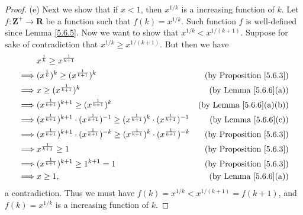 \begin{proof}{(e)}
    Next we show that if \(x < 1\), then \(x^{1 / k}\) is a increasing function of \(k\).
    Let \(f : \mathbf{Z}^+ \to \mathbf{R}\) be a function such that \(f(k) = x^{1 / k}\).
    Such function \(f\) is well-defined since Lemma \ref{5.6.5}.
    Now we want to show that \(x^{1 / k} < x^{1 / (k + 1)}\).
    Suppose for sake of contradiction that \(x^{1 / k} \geq x^{1 / (k + 1)}\).
    But then we have
    \begin{align*}
                 & x^{\frac{1}{k}} \geq x^{\frac{1}{k + 1}}                                                                                                                           \\
        \implies & (x^{\frac{1}{k}})^k \geq (x^{\frac{1}{k + 1}})^k                                                                             & \text{(by Proposition \ref{5.6.3})} \\
        \implies & x \geq (x^{\frac{1}{k + 1}})^k                                                                                               & \text{(by Lemma \ref{5.6.6}(a))}    \\
        \implies & (x^{\frac{1}{k + 1}})^{k + 1} \geq (x^{\frac{1}{k + 1}})^k                                                                   & \text{(by Lemma \ref{5.6.6}(a)(b))} \\
        \implies & (x^{\frac{1}{k + 1}})^{k + 1} \cdot (x^{\frac{1}{k + 1}})^{-1} \geq (x^{\frac{1}{k + 1}})^k \cdot (x^{\frac{1}{k + 1}})^{-1} & \text{(by Lemma \ref{5.6.6}(c))}    \\
        \implies & (x^{\frac{1}{k + 1}})^{k + 1} \cdot (x^{\frac{1}{k + 1}})^{-k} \geq (x^{\frac{1}{k + 1}})^k \cdot (x^{\frac{1}{k + 1}})^{-k} & \text{(by Proposition \ref{5.6.3})} \\
        \implies & x^{\frac{1}{k + 1}} \geq 1                                                                                                   & \text{(by Proposition \ref{5.6.3})} \\
        \implies & (x^{\frac{1}{k + 1}})^{k + 1} \geq 1^{k + 1} = 1                                                                             & \text{(by Proposition \ref{5.6.3})} \\
        \implies & x \geq 1,                                                                                                                    & \text{(by Lemma \ref{5.6.6}(a))}
    \end{align*}
    a contradiction.
    Thus we must have \(f(k) = x^{1 / k} < x^{1 / (k + 1)} = f(k + 1)\), and \(f(k) = x^{1 / k}\) is a increasing function of \(k\).


\end{proof}
